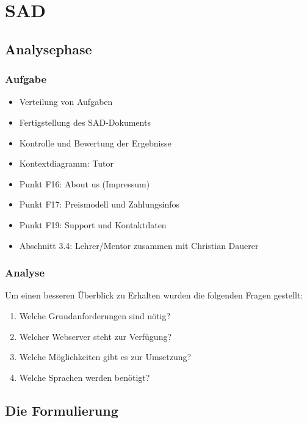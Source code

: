 \section{SAD}
\subsection{Analysephase}

\begin{frame} %
  \frametitle{Aufgabe} %

  	\begin{itemize}
   		\item Verteilung von Aufgaben
   		\item Fertigstellung des SAD-Dokuments
   		\item Kontrolle und Bewertung der Ergebnisse
  	\end{itemize}
	\bigskip {}
	\begin{itemize}
		\item Kontextdiagramm: Tutor
		\item Punkt F16: About us (Impressum)
		\item Punkt F17: Preismodell und Zahlungsinfos
		\item Punkt F19: Support und Kontaktdaten
		\item Abschnitt 3.4: Lehrer/Mentor zusammen mit Christian Dauerer
	\end{itemize}
\end{frame}

\begin{frame} %
  \frametitle{Analyse} %

  Um einen besseren Überblick zu Erhalten wurden die folgenden Fragen gestellt:
  \bigskip
  \begin{enumerate}
   \item Welche Grundanforderungen sind nötig?
   \item Welcher Webserver steht zur Verfügung?
   \item Welche Möglichkeiten gibt es zur Umsetzung?
   \item Welche Sprachen werden benötigt?
  \end{enumerate}

\end{frame}

\subsection{Die Formulierung}

